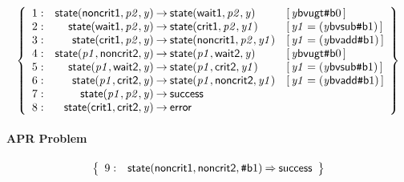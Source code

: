 \documentclass[a4paper]{article}
\newcommand{\ttsym}[1]{\mbox{\tt #1}}
\def\ttsharp{\ttsym{\symbol{35}}}
\newcommand{\symb}[1]{\mathsf{#1}}
\newcommand{\var}[1]{\mathit{#1}}
\newcommand{\Constraint}[1]{[\, #1 \,]}
\newcommand{\bv}[2][b]{{\ttsharp\symb{#1}{#2}}}
\begin{document}
\[
\left\{
\begin{array}{rr@{\>}c@{\>}ll}
\mathrm{1} : 
 & \symb{state}(\symb{noncrit1},\var{p2},\var{y})
 & \to 
 & \symb{state}(\symb{wait1},\var{p2},\var{y})
 & \Constraint{\var{y} \symb{bvugt} \bv{0}}\\

\mathrm{2} : 
 & \symb{state}(\symb{wait1},\var{p2},\var{y})
 & \to 
 & \symb{state}(\symb{crit1},\var{p2},\var{y1})
 & \Constraint{\var{y1} = (\var{y} \symb{bvsub} \bv{1})}\\

\mathrm{3} : 
 & \symb{state}(\symb{crit1},\var{p2},\var{y})
 & \to 
 & \symb{state}(\symb{noncrit1},\var{p2},\var{y1})
 & \Constraint{\var{y1} = (\var{y} \symb{bvadd} \bv{1})}\\

\mathrm{4} : 
 & \symb{state}(\var{p1},\symb{noncrit2},\var{y})
 & \to 
 & \symb{state}(\var{p1},\symb{wait2},\var{y})
 & \Constraint{\var{y} \symb{bvugt} \bv{0}}\\

\mathrm{5} : 
 & \symb{state}(\var{p1},\symb{wait2},\var{y})
 & \to 
 & \symb{state}(\var{p1},\symb{crit2},\var{y1})
 & \Constraint{\var{y1} = (\var{y} \symb{bvsub} \bv{1})}\\

\mathrm{6} : 
 & \symb{state}(\var{p1},\symb{crit2},\var{y})
 & \to 
 & \symb{state}(\var{p1},\symb{noncrit2},\var{y1})
 & \Constraint{\var{y1} = (\var{y} \symb{bvadd} \bv{1})}\\

\mathrm{7} : 
 & \symb{state}(\var{p1},\var{p2},\var{y})
 & \to 
 & \symb{success}\\

\mathrm{8} : 
 & \symb{state}(\symb{crit1},\symb{crit2},\var{y})
 & \to 
 & \symb{error}\\

\end{array}
\right\}
\]


\paragraph{APR Problem}

\[
\left\{
\begin{array}{rr@{\>}c@{\>}ll}
\mathrm{9} : 
 & \symb{state}(\symb{noncrit1},\symb{noncrit2},\bv{1})
 & \Rightarrow 
 & \symb{success}\\

\end{array}
\right\}
\]
\end{document}
